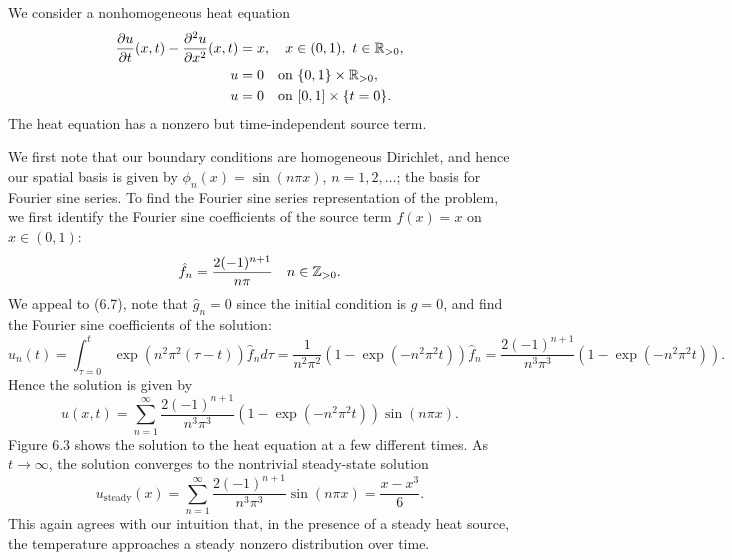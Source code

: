 \begin{example}
    We consider a nonhomogeneous heat equation
    \begin{align*}
        \frac{\partial u}{\partial t}(x, t) - \frac{\partial^2 u}{\partial x^2}(x, t) &= x, \quad x \in (0, 1), \ t \in \mathbb{R}_{>0}, \\
        u &= 0 \quad \text{on } \{0, 1\} \times \mathbb{R}_{>0}, \\
        u &= 0 \quad \text{on } [0, 1] \times \{t = 0\}.
    \end{align*}
    The heat equation has a nonzero but time-independent source term.

    We first note that our boundary conditions are homogeneous Dirichlet, and hence our spatial basis is given by $\phi_n(x) = \sin(n\pi x)$, $n = 1, 2, \dots$; the basis for Fourier sine series. To find the Fourier sine series representation of the problem, we first identify the Fourier sine coefficients of the source term $f(x) = x$ on $x \in (0, 1)$:
    \[\hat{f}_n = \frac{2(-1)^{n+1}}{n\pi} \quad n \in \mathbb{Z}_{>0}.\]
    We appeal to (6.7), note that $\hat{g}_n = 0$ since the initial condition is $g = 0$, and find the Fourier sine coefficients of the solution:
    \[\hat{u}_n(t) = \int_{\tau=0}^{t} \exp(n^2\pi^2(\tau - t)) \hat{f}_n d\tau = \frac{1}{n^2\pi^2} (1 - \exp(-n^2\pi^2 t)) \hat{f}_n = \frac{2(-1)^{n+1}}{n^3\pi^3} (1 - \exp(-n^2\pi^2 t)).\]
    Hence the solution is given by
    \[u(x, t) = \sum_{n=1}^{\infty} \frac{2(-1)^{n+1}}{n^3\pi^3} (1 - \exp(-n^2\pi^2 t)) \sin(n\pi x).\]
    Figure 6.3 shows the solution to the heat equation at a few different times. As $t \to \infty$, the solution converges to the nontrivial steady-state solution
    \[u_{\text{steady}}(x) = \sum_{n=1}^{\infty} \frac{2(-1)^{n+1}}{n^3\pi^3} \sin(n\pi x) = \frac{x - x^3}{6}.\]
    This again agrees with our intuition that, in the presence of a steady heat source, the temperature approaches a steady nonzero distribution over time.
\end{example}


